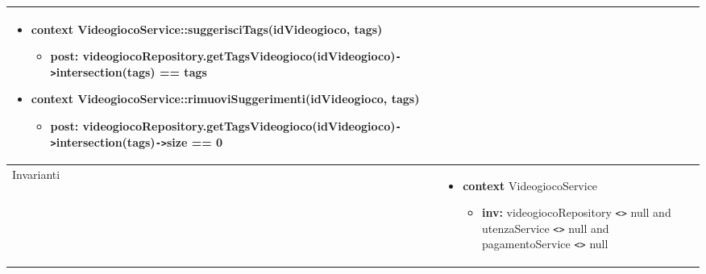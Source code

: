 \begin{tabular}{|| l | p{28em} ||}
\begin{itemize}[leftmargin=*]
		\item \textbf{context} VideogiocoService::suggerisciTags(idVideogioco, tags)
		\begin{itemize}
			\item[ ] \textbf{post:} videogiocoRepository\newline .getTagsVideogioco(idVideogioco)\verb|->|intersection(tags) == tags
		\end{itemize}

		\item \textbf{context} VideogiocoService::rimuoviSuggerimenti(idVideogioco, tags)
		\begin{itemize}
			\item[ ] \textbf{post:} videogiocoRepository\newline .getTagsVideogioco(idVideogioco)\verb|->|intersection(tags)\newline \verb|->|size == 0
		\end{itemize}
	\end{itemize}\\
	\hline
	Invarianti & \begin{itemize}
		\item \textbf{context} VideogiocoService
		\begin{itemize}
			\item[ ] \textbf{inv:} videogiocoRepository \verb|<>| null and utenzaService \verb|<>| null and pagamentoService \verb|<>| null
		\end{itemize}
	\end{itemize}\\
	\hline
\end{tabular}

